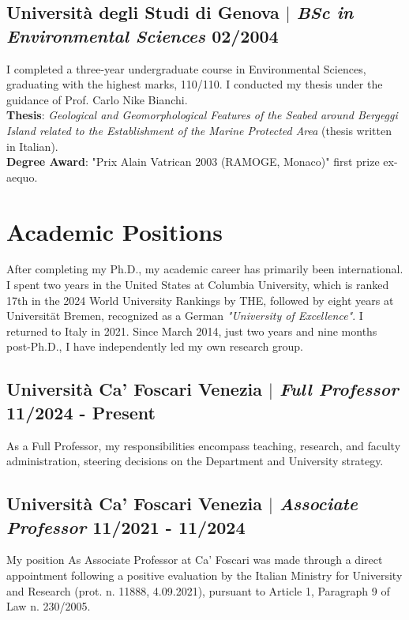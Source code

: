 \documentclass[11pt]{article}
\begin{document}
\subsection{Università degli Studi di Genova $|$ {\normalfont\textit{BSc in Environmental Sciences}} \hfill 02/2004}
{\footnotesize I completed a three-year undergraduate course in Environmental Sciences, graduating with the highest marks, 110/110. I conducted my thesis under the guidance of Prof. Carlo Nike Bianchi. \\
\textbf{Thesis}: \textit{Geological and Geomorphological Features of the Seabed around Bergeggi Island related to the Establishment of the Marine Protected Area} (thesis written in Italian).\\
\textbf{Degree Award}: "Prix Alain Vatrican 2003 (RAMOGE, Monaco)" first prize ex-aequo.}
\newpage

\section{Academic Positions}
{\normalfont After completing my Ph.D., my academic career has primarily been international. I spent two years in the United States at Columbia University, which is ranked 17th in the 2024 World University Rankings by THE, followed by eight years at Universität Bremen, recognized as a German \textit{"University of Excellence"}. I returned to Italy in 2021. Since March 2014, just two years and nine months post-Ph.D., I have independently led my own research group.}\\
\bigskip
\subsection{Università Ca' Foscari Venezia $|$ {\normalfont\textit{Full Professor}} \hfill 11/2024 - Present}
{\footnotesize As a Full Professor, my responsibilities encompass teaching, research, and faculty administration, steering decisions on the Department and University strategy.}
\bigskip
\subsection{Università Ca' Foscari Venezia $|$ {\normalfont\textit{Associate Professor}} \hfill 11/2021 - 11/2024}
{\footnotesize My position As Associate Professor at Ca' Foscari was made through a direct appointment following a positive evaluation by the Italian Ministry for University and Research (prot. n. 11888, 4.09.2021), pursuant to Article 1, Paragraph 9 of Law n. 230/2005.}
\bigskip
\end{document}
